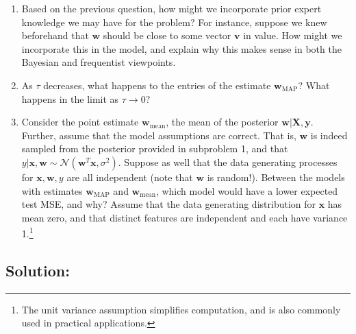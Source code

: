 \documentclass[submit]{harvardml}
\begin{document}
\begin{problem}
\begin{enumerate}
        \item Based on the previous question, how might we incorporate prior expert knowledge we may have for the problem? For instance, suppose we knew beforehand that $\mathbf{w}$ should be close to some vector $\mathbf{v}$ in value. How might we incorporate this in the model, and explain why this makes sense in both the Bayesian and frequentist viewpoints.
        
        \item As $\tau$ decreases, what happens to the entries of the estimate $\mathbf{w}_{\mathrm{MAP}}$? What happens in the limit as $\tau \to 0$?
        
        \item Consider the point estimate $\mathbf{w}_{\mathrm{mean}}$, the mean of the posterior $\mathbf{w}|\mathbf{X},\mathbf{y}$. Further, assume that the model assumptions are correct. That is, $\mathbf{w}$ is indeed sampled from the posterior provided in subproblem 1, and that $y|\mathbf{x},\mathbf{w}\sim\mathcal{N}(\mathbf{w}^T\mathbf{x},\sigma^2)$. Suppose as well that the data generating processes for $\mathbf{x},\mathbf{w},y$ are all independent (note that $\mathbf{w}$ is random!). Between the models with estimates $\mathbf{w}_{\mathrm{MAP}}$ and $\mathbf{w}_{\mathrm{mean}}$, which model would have a lower expected test MSE, and why? Assume that the data generating distribution for $\mathbf{x}$ has mean zero, and that distinct features are independent and each have variance 1.\footnote{The unit variance assumption simplifies computation, and is also commonly used in practical applications.}
        
    \end{enumerate}
  
  
\end{problem}

\subsection*{Solution:}
\end{document}
